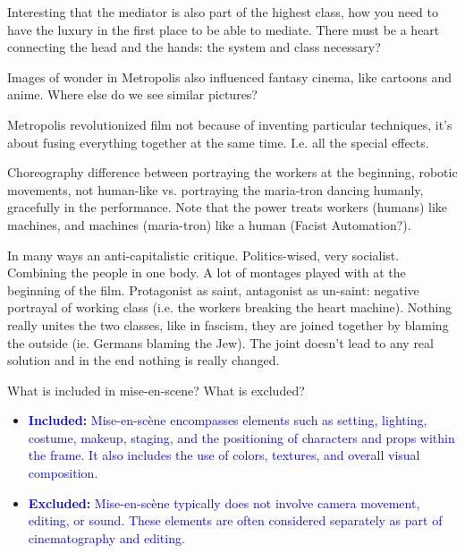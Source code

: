 \documentclass[11pt,fleqn]{book}
\begin{document}
\begin{descriptions}
\begin{itemize}
\begin{itemize}
\begin{itemize}
            \end{itemize}
        \end{itemize}
    \end{itemize}
    \begin{remark}
        Interesting that the mediator is also part of the highest class, how you need to have the luxury in the first place to be able to mediate. There must be a heart connecting the head and the hands: the system and class necessary? 
    \end{remark}
    \begin{remark}
        Images of wonder in Metropolis also influenced fantasy cinema, like cartoons and anime. Where else do we see similar pictures?
    \end{remark}
    \begin{remark}
        Metropolis revolutionized film not because of inventing particular techniques, it's about fusing everything together at the same time. I.e. all the special effects.
    \end{remark}
    \begin{remark}
        Choreography difference between portraying the workers at the beginning, robotic movements, not human-like vs. portraying the maria-tron dancing humanly, gracefully in the performance. Note that the power treats workers (humans) like machines, and machines (maria-tron) like a human (Facist Automation?).
    \end{remark}
    \begin{remark}
        In many ways an anti-capitalistic critique. Politics-wised, very socialist. Combining the people in one body. A lot of montages played with at the beginning of the film. Protagonist as saint, antagonist as un-saint: negative portrayal of working class (i.e. the workers breaking the heart machine). Nothing really unites the two classes, like in fascism, they are joined together by blaming the outside (ie. Germans blaming the Jew). The joint doesn't lead to any real solution and in the end nothing is really changed.
    \end{remark}
\end{descriptions}

\begin{exercise}
    What is included in mise-en-scene? What is excluded?
    \begin{itemize}
        \item \textcolor{blue}{\textbf{Included:} Mise-en-scène encompasses elements such as setting, lighting, costume, makeup, staging, and the positioning of characters and props within the frame. It also includes the use of colors, textures, and overall visual composition.}
        \item \textcolor{blue}{\textbf{Excluded:} Mise-en-scène typically does not involve camera movement, editing, or sound. These elements are often considered separately as part of cinematography and editing.}
    \end{itemize}
\end{exercise}
\end{document}
